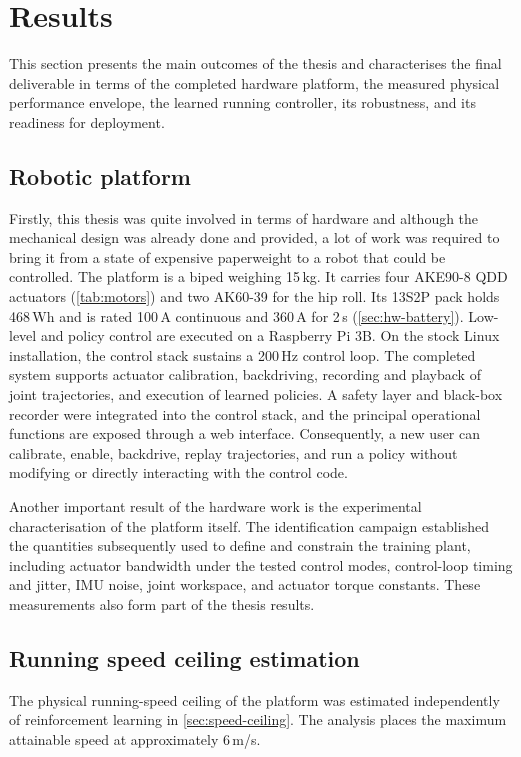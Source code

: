 \section{Results}
\label{sec:results}

This section presents the main outcomes of the thesis and characterises the final deliverable in terms of the completed hardware platform, the measured physical performance envelope, the learned running controller, its robustness, and its readiness for deployment.
\subsection{Robotic platform}

Firstly, this thesis was quite involved in terms of hardware and although the mechanical design was already done and provided, a lot of work was required to bring it from a state of expensive paperweight to a robot that could be controlled.
The platform is a biped weighing 15\,kg.
It carries four AKE90-8 QDD actuators (\cref{tab:motors}) and two AK60-39 for the hip roll.
Its 13S2P pack holds 468\,Wh and is rated 100\,A continuous and 360\,A for 2\,s (\cref{sec:hw-battery}).
Low-level and policy control are executed on a Raspberry Pi 3B.
On the stock Linux installation, the control stack sustains a 200\,Hz control loop.
The completed system supports actuator calibration, backdriving, recording and playback of joint trajectories, and execution of learned policies.
A safety layer and black-box recorder were integrated into the control stack, and the principal operational functions are exposed through a web interface.
Consequently, a new user can calibrate, enable, backdrive, replay trajectories, and run a policy without modifying or directly interacting with the control code.

Another important result of the hardware work is the experimental characterisation of the platform itself.
The identification campaign established the quantities subsequently used to define and constrain the training plant, including actuator bandwidth under the tested control modes, control-loop timing and jitter, IMU noise, joint workspace, and actuator torque constants.
These measurements also form part of the thesis results.
\subsection{Running speed ceiling estimation}
The physical running-speed ceiling of the platform was estimated independently of reinforcement learning in \cref{sec:speed-ceiling}.
The analysis places the maximum attainable speed at approximately 6\,m/s.

